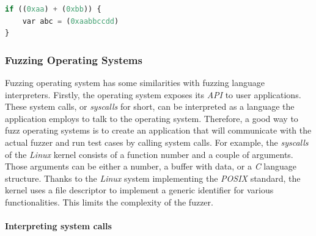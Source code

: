 \pagebreak
\begin{minipage}{\linewidth}
\begin{lstlisting}[language=python,caption={Generated program from syntax tree.},label={lst:gensrc}]
if ((0xaa) + (0xbb)) {
    var abc = (0xaabbccdd)
}    
\end{lstlisting}    
\end{minipage}


\subsubsection{Fuzzing Operating Systems}

Fuzzing operating system has some similarities with fuzzing language interpreters. Firstly, the operating system exposes its \textit{API} to user applications. These system calls, or \textit{syscalls} for short, can be interpreted as a language the application employs to talk to the operating system. Therefore, a good way to fuzz operating systems is to create an application that will communicate with the actual fuzzer and run test cases by calling system calls. For example, the \textit{syscalls} of the \textit{Linux} kernel consists of a function number and a couple of arguments. Those arguments can be either a number, a buffer with data, or a \textit{C} language structure. Thanks to the \textit{Linux} system implementing the \textit{POSIX} standard, the kernel uses a file descriptor to implement a generic identifier for various functionalities. This limits the complexity of the fuzzer. 

\paragraph{Interpreting system calls}
 
